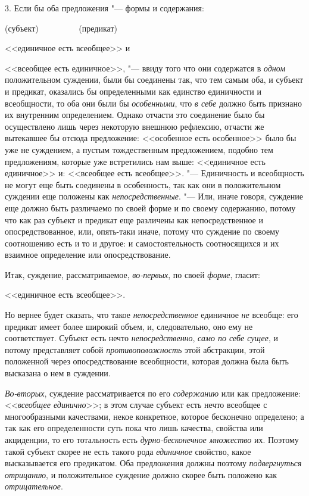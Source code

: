 {3. Если бы оба предложения "--- формы и содержания:\label{bkm:bm34a}

(субъект) \ \ \ \ \ \ \ \ \ (предикат)

<<единичное есть всеобщее>> и

<<всеобщее есть единичное>>, "--- \newline
ввиду того что они содержатся в
{\em одном} положительном
суждении, были бы соединены так, что тем самым оба, и субъект и предикат,
оказались бы определенными как единство единичности и всеобщности, то оба
они были бы {\em особенными},
что {\em в себе}
должно быть признано их внутренним определением. Однако
отчасти это соединение было бы осуществлено лишь через некоторую внешнюю
рефлексию, отчасти же вытекавшее бы отсюда предложение: <<особенное есть
особенное>> было бы уже не суждением, а пустым тождественным предложением,
подобно тем предложениям, которые уже встретились нам выше: <<единичное есть
единичное>> и: <<всеобщее есть всеобщее>>. "--- Единичность и
всеобщность не могут еще быть соединены в особенность, так как они в
положительном суждении еще положены как
{\em непосредственные}. "---
Или, иначе говоря, суждение еще должно быть различаемо по
своей форме и по своему содержанию, потому что как раз субъект и предикат
еще различены как непосредственное и опосредствованное, или, опять-таки
иначе, потому что суждение по своему соотношению есть и то и другое: и
самостоятельность соотносящихся и их взаимное определение или
опосредствование.

Итак, суждение, рассматриваемое,
{\em во-первых}, по своей
{\em форме}, гласит:

<<единичное есть всеобщее>>.

Но вернее будет сказать, что такое
{\em непосредственное}
единичное {\em не}
всеобще: его предикат имеет более широкий объем, и,
следовательно, оно ему не соответствует. Субъект есть нечто
{\em непосредственно},
{\em само по себе сущее},
и потому представляет собой
{\em противоположность}
этой абстракции, этой положенной через опосредствование
всеобщности, которая должна была быть высказана о нем в суждении.

{\em Во-вторых}, суждение
рассматривается по его {\em содержанию}
или как предложение:
<<{\em всеобщее единично}>>;
в этом случае субъект есть нечто всеобщее с многообразными
качествами, некое конкретное, которое бесконечно определено; а так как его
определенности суть пока что лишь качества, свойства или акциденции, то его
тотальность есть {\em дурно-бесконечное
множество} их. Поэтому такой субъект скорее не есть такого
рода {\em единичное}
свойство, какое высказывается его предикатом. Оба предложения
должны поэтому {\em подвергнуться
отрицанию}, и положительное суждение должно скорее быть
положено как {\em отрицательное}.

}
